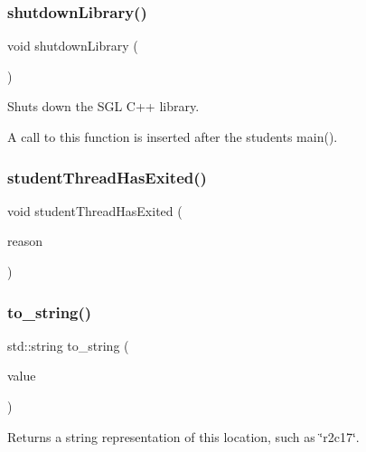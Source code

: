 \subsubsection{\texorpdfstring{shutdown\+Library()}{shutdownLibrary()}}
{\footnotesize\ttfamily void shutdown\+Library (\begin{DoxyParamCaption}{ }\end{DoxyParamCaption})}



Shuts down the S\+GL C++ library. 

A call to this function is inserted after the student\textquotesingle{}s main(). \mbox{\label{namespacesgl_ad119146bad8508df277e3f629d26284d}} 
\subsubsection{\texorpdfstring{student\+Thread\+Has\+Exited()}{studentThreadHasExited()}}
{\footnotesize\ttfamily void student\+Thread\+Has\+Exited (\begin{DoxyParamCaption}\item[{const std\+::string \&}]{reason }\end{DoxyParamCaption})}

\mbox{\label{namespacesgl_a7be53d4b8cec49579140688509dff3fb}} 
\subsubsection{\texorpdfstring{to\+\_\+string()}{to\_string()}}
{\footnotesize\ttfamily std\+::string to\+\_\+string (\begin{DoxyParamCaption}\item[{const \mbox{\hyperlink{structsgl_1_1GTableIndex}{G\+Table\+Index}} \&}]{value }\end{DoxyParamCaption})}



Returns a string representation of this location, such as \char`\"{}r2c17\char`\"{}. 

\mbox{\label{namespacesgl_a78f42a71b768864c2b53c0f29fd17292}} 
